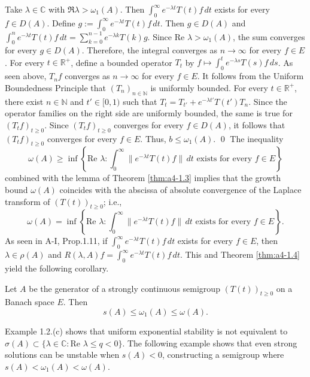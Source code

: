 \)
Take \(\lambda \in \mathbb{C}\) with \(\Re \lambda > \omega_1(A)\). 
Then \(\int_0^\infty e^{-\lambda t} T(t) f \, dt\) exists for every \(f \in D(A)\). 
Define \(g := \int_0^\infty e^{-\lambda t} T(t) f \, dt\). 
Then \(g \in D(A)\) and \(\int_0^n e^{-\lambda t} T(t) f \, dt = \sum_{k=0}^{n-1} e^{-\lambda k} T(k) g\). 
Since \(\text{Re } \lambda > \omega_1(A)\), the sum converges for every \(g \in D(A)\). 
Therefore, the integral converges as \(n \to \infty\) for every \(f \in E\).
For every \(t \in \mathbb{R}^+\), define a bounded operator \(T_t\) by \( f \mapsto \int_0^t e^{-\lambda s} T(s) f \, ds\). 
As seen above, \(T_n f\) converges as \(n \to \infty\) for every \(f \in E\). 
It follows from the Uniform Boundedness Principle that \((T_n)_{n \in \mathbb{N}}\) is uniformly bounded.
\noindent
For every \(t \in \mathbb{R}^+\), there exist \(n \in \mathbb{N}\) and \(t' \in [0,1)\) such that \(T_t = T_{t'} + e^{-\lambda t'} T(t') T_n\). 
Since the operator families on the right side are uniformly bounded, the same is true for \((T_t f)_{t \geq 0}\). 
Since \((T_t f)_{t \geq 0}\) converges for every \(f \in D(A)\), it follows that \((T_t f)_{t \geq 0}\) converges for every \(f \in E\). 
Thus, \(b \leq \omega_1(A)\).
\qed
\bigskip
\noindent
The inequality
\[
    \omega(A) \geq \inf \left\{ \text{Re } \lambda : \int_0^\infty \|e^{-\lambda t} T(t) f \| \, dt 
    \text{ exists for every } f \in E \right\}
\]
combined with the lemma of Theorem \ref{thm:a4-1.3} implies that the growth bound \(\omega(A)\) coincides with the abscissa of absolute convergence of the Laplace transform of \((T(t))_{t \geq 0}\); i.e.,
\begin{equation}\label{eq:a4-1.6}
   \omega(A) = \inf \left\{ \text{Re } \lambda : \int_0^\infty \|e^{-\lambda t} T(t) f \| \, dt \text{ exists for every } f \in E \right\}.
\end{equation}
\noindent
As seen in A-I, Prop.1.11, if \(\int_0^\infty e^{-\lambda t} T(t) f \, dt\) exists for every \(f \in E\), then \(\lambda \in \rho(A)\) and \(R(\lambda, A) f = \int_0^\infty e^{-\lambda t} T(t) f \, dt\). 
This and Theorem \ref{thm:a4-1.4} yield the following corollary.
\begin{corollary} \label{cor:a4-1.5} Let \( A \) be the generator of a strongly continuous semigroup \( (T(t))_{t \geq 0} \) on a Banach space \( E \). 
Then  
\[
s(A) \leq \omega_1(A) \leq \omega(A).
\]
\end{corollary}

\noindent Example 1.2.(c) shows that uniform exponential stability is not equivalent to \( \sigma(A) \subset \{\lambda \in \mathbb{C} : \text{Re } \lambda \leq q < 0 \} \). 
The following example shows that even strong solutions can be unstable when \( s(A) < 0 \), constructing a semigroup where \( s(A) < \omega_1(A) < \omega(A) \).

